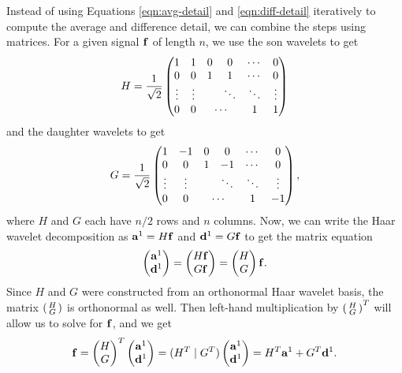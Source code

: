 \documentclass[12pt]{article}
\theoremstyle{definition}
\begin{document}
  Instead of using Equations \eqref{eqn:avg-detail} and \eqref{eqn:diff-detail} iteratively to compute the average and difference detail, we can combine the steps using matrices.
  For a given signal \(\vb{f}\) of length \(n\), we use the son wavelets to get
  \begin{equation}
    H = \frac{1}{\sqrt{2}}
    \begin{pmatrix}
      1 & 1 & 0 & 0 & \cdots & 0\\
      0 & 0 & 1 & 1 & \cdots & 0\\
      \vdots & \vdots &  & \ddots & \ddots & \vdots\\
      0 & 0 & \multicolumn{2}{c}{\cdots} & 1 & 1
    \end{pmatrix}
  \end{equation}
  and the daughter wavelets to get
  \begin{equation}
    G = \frac{1}{\sqrt{2}}
    \begin{pmatrix}
      1 & -1 & 0 & 0 & \cdots & 0\\
      0 & 0 & 1 & -1 & \cdots & 0\\
      \vdots & \vdots &  & \ddots & \ddots & \vdots\\
      0 & 0 & \multicolumn{2}{c}{\cdots} & 1 & -1
    \end{pmatrix},
  \end{equation}
  where \(H\) and \(G\) each have \(n/2\) rows and \(n\) columns. Now, we can write the Haar wavelet decomposition as \(\vb{a}^1 = H \vb{f}\) and \(\vb{d}^1 = G\vb{f}\) to get the matrix equation
  \begin{equation}
    \begin{pmatrix}
      \vb{a}^1 \\ \vb{d}^1
    \end{pmatrix} =
    \begin{pmatrix}
      H\vb{f} \\ G\vb{f}
    \end{pmatrix} =
    \begin{pmatrix}
      H \\ G
    \end{pmatrix} \vb{f}.
  \end{equation}
  Since \(H\) and \(G\) were constructed from an orthonormal Haar wavelet basis, the matrix \(\smqty(H \\ G)\) is orthonormal as well. Then left-hand multiplication by \(\smqty(H \\ G)^T\) will allow us to solve for \(\vb{f}\), and we get
  \begin{equation}
    \vb{f} =
    \begin{pmatrix}
      H \\ G
    \end{pmatrix}^T
    \begin{pmatrix}
      \vb{a}^1 \\ \vb{d}^1
    \end{pmatrix} =
      (H^T \mid G^T)
    \begin{pmatrix}
      \vb{a}^1 \\ \vb{d}^1
    \end{pmatrix} =
    H^T \vb{a}^1 + G^T \vb{d}^1.
  \end{equation}
\end{document}
